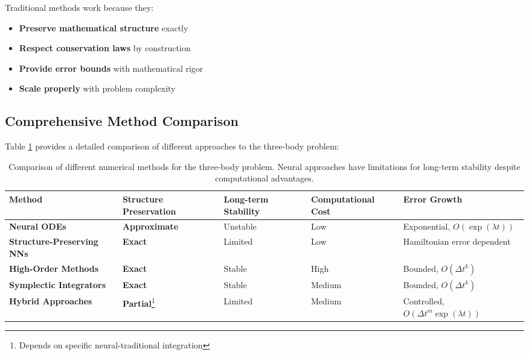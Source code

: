 \documentclass[11pt,a4paper]{article}
\begin{document}
Traditional methods work because they:
\begin{itemize}
    \item \textbf{Preserve mathematical structure} exactly
    \item \textbf{Respect conservation laws} by construction
    \item \textbf{Provide error bounds} with mathematical rigor
    \item \textbf{Scale properly} with problem complexity
\end{itemize}

\subsection{Comprehensive Method Comparison}

\vspace{0.5cm}

Table \ref{tab:method_comparison} provides a detailed comparison of different approaches to the three-body problem:

\begin{table}[h]
\centering
\begin{tabular}{p{2.5cm}p{2.5cm}p{2.0cm}p{2.0cm}p{3.0cm}}
\toprule
\textbf{Method} & \textbf{Structure Preservation} & \textbf{Long-term Stability} & \textbf{Computational Cost} & \textbf{Error Growth} \\
\midrule
\textbf{Neural ODEs} & \textbf{Approximate} & Unstable & Low & Exponential, $O(\exp(\lambda t))$ \\
\textbf{Structure-Preserving NNs} & \textbf{Exact} & Limited & Low & Hamiltonian error dependent \\
\textbf{High-Order Methods} & \textbf{Exact} & Stable & High & Bounded, $O(\Delta t^k)$ \\
\textbf{Symplectic Integrators} & \textbf{Exact} & Stable & Medium & Bounded, $O(\Delta t^k)$ \\
\textbf{Hybrid Approaches} & \textbf{Partial}\footnote{Depends on specific neural-traditional integration} & Limited & Medium & Controlled, $O(\Delta t^m \exp(\lambda t))$ \\
\bottomrule
\end{tabular}
\caption{Comparison of different numerical methods for the three-body problem. Neural approaches have limitations for long-term stability despite computational advantages.}
\label{tab:method_comparison}
\end{table}

\end{document}
